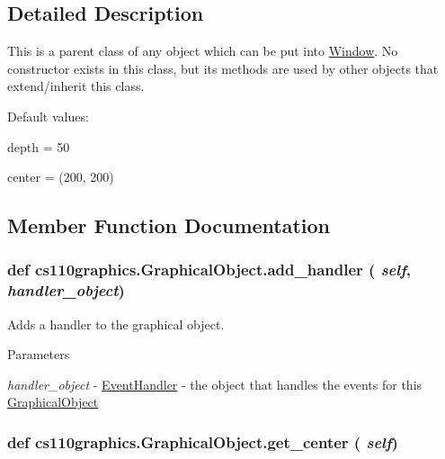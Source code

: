 \subsection{Detailed Description}
This is a parent class of any object which can be put into \hyperlink{classcs110graphics_1_1Window}{Window}. No constructor exists in this class, but its methods are used by other objects that extend/inherit this class.

Default values:
\begin{DoxyItemize}
\item depth = 50
\item center = (200, 200) 
\end{DoxyItemize}

\subsection{Member Function Documentation}
\hypertarget{classcs110graphics_1_1GraphicalObject_adb1af0d5a6baae3f9a08d21a3227c49f}{
\subsubsection[{add\_\-handler}]{\setlength{\rightskip}{0pt plus 5cm}def cs110graphics.GraphicalObject.add\_\-handler ( {\em self}, \/   {\em handler\_\-object})}}
\label{classcs110graphics_1_1GraphicalObject_adb1af0d5a6baae3f9a08d21a3227c49f}


Adds a handler to the graphical object. 
\begin{DoxyParams}{Parameters}
\item[{\em handler\_\-object}]-\/ \hyperlink{classcs110graphics_1_1EventHandler}{EventHandler} -\/ the object that handles the events for this \hyperlink{classcs110graphics_1_1GraphicalObject}{GraphicalObject} \end{DoxyParams}
\hypertarget{classcs110graphics_1_1GraphicalObject_a062789c4cc9de38af32dcc4ff2058607}{
\subsubsection[{get\_\-center}]{\setlength{\rightskip}{0pt plus 5cm}def cs110graphics.GraphicalObject.get\_\-center ( {\em self})}}
\label{classcs110graphics_1_1GraphicalObject_a062789c4cc9de38af32dcc4ff2058607}


